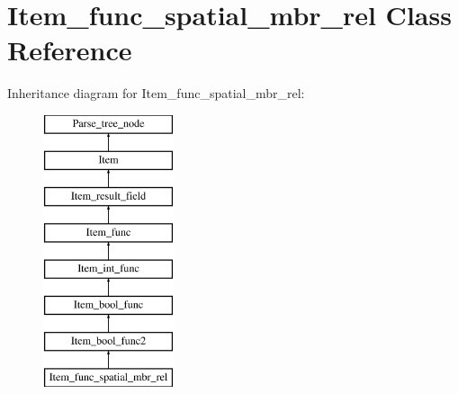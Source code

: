\hypertarget{classItem__func__spatial__mbr__rel}{}\section{Item\+\_\+func\+\_\+spatial\+\_\+mbr\+\_\+rel Class Reference}
\label{classItem__func__spatial__mbr__rel}
Inheritance diagram for Item\+\_\+func\+\_\+spatial\+\_\+mbr\+\_\+rel\+:\begin{figure}[H]
\begin{center}
\leavevmode
\includegraphics[height=8.000000cm]{classItem__func__spatial__mbr__rel}
\end{center}
\end{figure}

